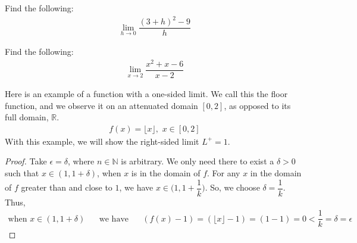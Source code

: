 \begin{exercise} Find the following:
\begin{align*}
    \lim_{h \longrightarrow 0} \dfrac{(3+h)^{2} - 9}{h}
\end{align*}
\end{exercise}

\begin{exercise}
Find the following:
\begin{align*}
    \lim_{x \longrightarrow 2} \dfrac{x^{2}+x-6}{x-2}
\end{align*}
\end{exercise}

\begin{example}
Here is an example of a function with a one-sided limit. We call this the floor function, and we observe it on an attenuated domain $[0, 2]$, as opposed to its full domain, $\mathbb{R}$. 
\begin{align*}
    f(x) = \lfloor x \rfloor, \hspace{4pt} x \in [0, 2]
\end{align*}
With this example, we will show the right-sided limit $L^{+} = 1$.
\begin{proof}
Take $\epsilon = \delta$, where $n \in \mathbb{N}$ is arbitrary. We only need there to exist a $\delta > 0$ such that $x \in (1, 1+\delta)$, when $x$ is in the domain of $f$. For any $x$ in the domain of $f$ greater than and close to $1$, we have $x \in \Big(1, 1+\dfrac{1}{k}\Big)$. So, we choose $\delta = \dfrac{1}{k}$. Thus,
\begin{align*}
    \text{when} \hspace{4pt} x \in (1, 1 + \delta) \hspace{20pt} \text{we have} \hspace{20pt} (f(x) - 1) = (\lfloor x \rfloor - 1) = (1 - 1) = 0 < \dfrac{1}{k} = \delta = \epsilon
\end{align*}
\end{proof}


\end{example}
